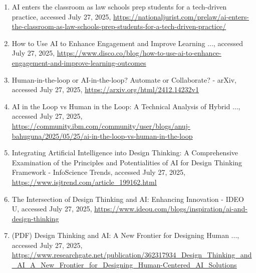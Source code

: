 \documentclass[
  12pt,
  a4paper,
  bibliography=totoc,
  numbers=noenddot
]{scrartcl}
\begin{document}
\iffalse
\begin{enumerate}
\def\labelenumi{\arabic{enumi}.}
\item
  AI enters the classroom as law schools prep students for a tech-driven
  practice, accessed July 27, 2025,
  \href{https://nationaljurist.com/prelaw/ai-enters-the-classroom-as-law-schools-prep-students-for-a-tech-driven-practice/}{\ul{https://nationaljurist.com/prelaw/ai-enters-the-classroom-as-law-schools-prep-students-for-a-tech-driven-practice/}}
\item
  How to Use AI to Enhance Engagement and Improve Learning ..., accessed
  July 27, 2025,
  \href{https://www.disco.co/blog/how-to-use-ai-to-enhance-engagement-and-improve-learning-outcomes}{\ul{https://www.disco.co/blog/how-to-use-ai-to-enhance-engagement-and-improve-learning-outcomes}}
\item
  Human-in-the-loop or AI-in-the-loop? Automate or Collaborate? - arXiv,
  accessed July 27, 2025,
  \href{https://arxiv.org/html/2412.14232v1}{\ul{https://arxiv.org/html/2412.14232v1}}
\item
  AI in the Loop vs Human in the Loop: A Technical Analysis of Hybrid
  ..., accessed July 27, 2025,
  \href{https://community.ibm.com/community/user/blogs/anuj-bahuguna/2025/05/25/ai-in-the-loop-vs-human-in-the-loop}{\ul{https://community.ibm.com/community/user/blogs/anuj-bahuguna/2025/05/25/ai-in-the-loop-vs-human-in-the-loop}}
\item
  Integrating Artificial Intelligence into Design Thinking: A
  Comprehensive Examination of the Principles and Potentialities of AI
  for Design Thinking Framework - InfoScience Trends, accessed July 27,
  2025,
  \href{https://www.isjtrend.com/article_199162.html}{\ul{https://www.isjtrend.com/article\_199162.html}}
\item
  The Intersection of Design Thinking and AI: Enhancing Innovation -
  IDEO U, accessed July 27, 2025,
  \href{https://www.ideou.com/blogs/inspiration/ai-and-design-thinking}{\ul{https://www.ideou.com/blogs/inspiration/ai-and-design-thinking}}
\item
  (PDF) Design Thinking and AI: A New Frontier for Designing Human ...,
  accessed July 27, 2025,
  \href{https://www.researchgate.net/publication/362317934_Design_Thinking_and_AI_A_New_Frontier_for_Designing_Human-Centered_AI_Solutions}{\ul{https://www.researchgate.net/publication/362317934\_Design\_Thinking\_and\_AI\_A\_New\_Frontier\_for\_Designing\_Human-Centered\_AI\_Solutions}}

\end{enumerate}
\end{document}
